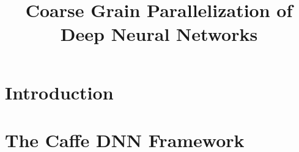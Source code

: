 \documentclass[preprint]{sigplanconf}
\begin{document}
\setlength{\pdfpageheight}{\paperheight}
\setlength{\pdfpagewidth}{\paperwidth}






\title{Coarse Grain Parallelization of Deep Neural Networks}

           {}
           {}

\maketitle

\begin{abstract}

\end{abstract}




\newcommand{\todo}[1]{}
\renewcommand{\todo}[1]{{\color{red} TODO: {#1}}}

\section{Introduction}
 

\section{The Caffe DNN Framework}
\label{sec-caffe}
 
\end{document}
